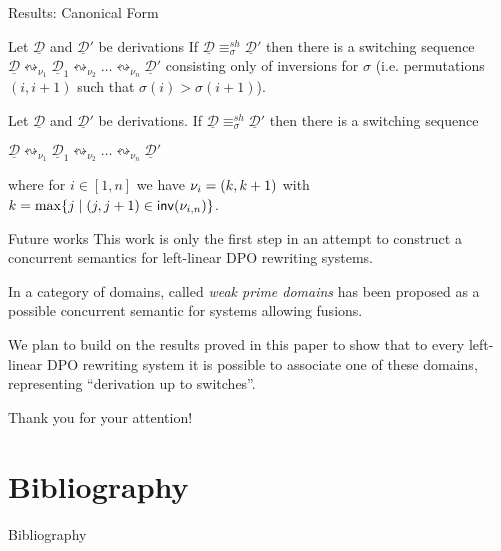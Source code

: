 \documentclass[usenames,dvipsnames]{beamer}
\newcommand{\shift}[1]{\ensuremath{\mathrel{{\leftrightsquigarrow}_{#1}}}}
\newcommand{\shifteq}[1][]{\ensuremath{\mathrel{{\equiv}^\mathit{sh}_{#1}}}}
\newcommand{\dder}[1]{\mathscr{#1}}
\newcommand{\inv}[1]{\mathsf{inv}({#1})}
\newcommand{\der}[1]{\underline{\dder{#1}}}
\begin{document}
\begin{frame}{Results: Canonical Form}\justifying
	
	\begin{theorem}
		Let $\der{D}$ and $\der{D}'$ be derivations If $\der{D} \shifteq[\sigma] \der{D}'$ then there is a switching sequence 
		$\der{D} \shift{\nu_1} \der{D}_1 \shift{\nu_2} \ldots
		\shift{\nu_n} \der{D}'$
		consisting only of inversions for $\sigma$ (i.e. permutations $(i, i+1)$ such that $\sigma(i)>\sigma(i+1)$).
	\end{theorem}
\pause 	
\begin{theorem}
	Let $\der{D}$ and $\der{D}'$ be derivations. If
	$\der{D} \shifteq[\sigma]\der{D}'$ then there is a switching sequence
	\begin{center}
		$\der{D} \shift{\nu_1} \der{D}_1 \shift{\nu_2} \ldots
		\shift{\nu_n} \der{D}'$
	\end{center}
	where for $i \in [1,n]$ we have $\nu_i  = \transp{k}$ with 
	$k = \max \{ j \mid \transp{j} \in \inv{\nu_{i,n}}\}$.
\end{theorem}
\end{frame}


\begin{frame}{Future works}\justifying 
	This work is only the first step in an attempt to construct a concurrent semantics for left-linear DPO rewriting systems.
	
	\medskip \pause 
	
	In \cite{baldan2021concurrent} a category of domains, called \emph{weak prime domains} has been proposed as a possible concurrent semantic for systems allowing fusions. 	
	
	\medskip \pause We plan to build on the results proved in this paper to show that to every left-linear DPO rewriting system it is possible to associate one of these domains, representing ``derivation up to switches''.
\end{frame}

\begin{frame}{\hspace{1pt}}
	\LARGE
	\begin{center}
		Thank you for your attention!
	\end{center}
	
\end{frame}


\section{Bibliography}
\begin{frame}[allowframebreaks]{Bibliography}\justifying 
\printbibliography
\end{frame}
\end{document}
